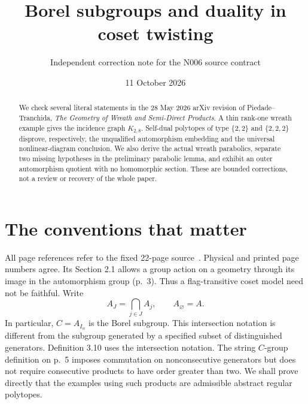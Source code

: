 \documentclass[11pt,a4paper]{article}
\title{Borel subgroups and duality in coset twisting}
\author{Independent correction note for the N006 source contract}
\date{11 October 2026}
\begin{document}
\maketitle
\begin{abstract}
We check several literal statements in the 28 May 2026 arXiv revision of
Piedade--Tranchida, \emph{The Geometry of Wreath and Semi-Direct Products}.
A thin rank-one wreath example gives the incidence graph $K_{2,8}$.
Self-dual polytopes of type $\{2,2\}$ and $\{2,2,2\}$ disprove, respectively,
the unqualified automorphism embedding and the universal nonlinear-diagram
conclusion. We also derive the actual wreath parabolics, separate two missing
hypotheses in the preliminary parabolic lemma, and exhibit an outer
automorphism quotient with no homomorphic section. These are bounded
corrections, not a review or recovery of the whole paper.
\end{abstract}

\section{The conventions that matter}
All page references refer to the fixed 22-page source~\cite{source}.
Physical and printed page numbers agree. Its Section 2.1
allows a group action on a geometry through its image in the automorphism
group (p.~3). Thus a flag-transitive coset model need not be faithful. Write
\[
 A_J=\bigcap_{j\in J}A_j,\qquad A_\varnothing=A.
\]
In particular, $C=A_{I_\alpha}$ is the Borel subgroup. This intersection
notation is different from the subgroup generated by a specified subset of
distinguished generators. Definition 3.10 uses the intersection notation.
The string $C$-group definition on p.~5 imposes commutation on
nonconsecutive generators but does not require consecutive products to have
order greater than two. We shall prove directly that the examples using
such products are admissible abstract regular polytopes.
\end{document}
